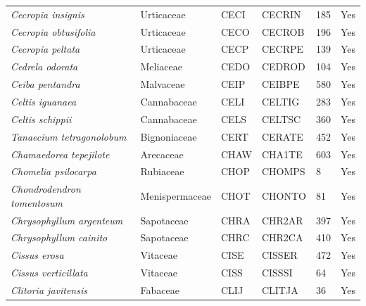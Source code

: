 \documentclass[11pt]{article}
\begin{document}
\begin{longtable}{@{}llllll@{}}
\textit{Cecropia insignis}                            & Urticaceae       & CECI   & CECRIN & 185             & Yes       \\
\textit{Cecropia obtusifolia}                         & Urticaceae       & CECO   & CECROB & 196             & Yes       \\
\textit{Cecropia peltata}                             & Urticaceae       & CECP   & CECRPE & 139             & Yes       \\
\textit{Cedrela odorata}                              & Meliaceae        & CEDO   & CEDROD & 104             & Yes       \\
\textit{Ceiba pentandra}                              & Malvaceae        & CEIP   & CEIBPE & 580             & Yes       \\
\textit{Celtis iguanaea}                              & Cannabaceae      & CELI   & CELTIG & 283             & Yes       \\
\textit{Celtis schippii}                              & Cannabaceae      & CELS   & CELTSC & 360             & Yes       \\
\textit{Tanaecium tetragonolobum}                     & Bignoniaceae     & CERT   & CERATE & 452             & Yes       \\
\textit{Chamaedorea tepejilote}                       & Arecaceae        & CHAW   & CHA1TE & 603             & Yes       \\
\textit{Chomelia psilocarpa}                          & Rubiaceae        & CHOP   & CHOMPS & 8               & Yes       \\
\textit{Chondrodendron tomentosum}                    & Menispermaceae   & CHOT   & CHONTO & 81              & Yes       \\
\textit{Chrysophyllum argenteum}                      & Sapotaceae       & CHRA   & CHR2AR & 397             & Yes       \\
\textit{Chrysophyllum cainito}                        & Sapotaceae       & CHRC   & CHR2CA & 410             & Yes       \\
\textit{Cissus erosa}                                 & Vitaceae         & CISE   & CISSER & 472             & Yes       \\
\textit{Cissus verticillata}                          & Vitaceae         & CISS   & CISSSI & 64              & Yes       \\
\textit{Clitoria javitensis}                          & Fabaceae         & CLIJ   & CLITJA & 36              & Yes       \\

\end{longtable}
\end{document}
